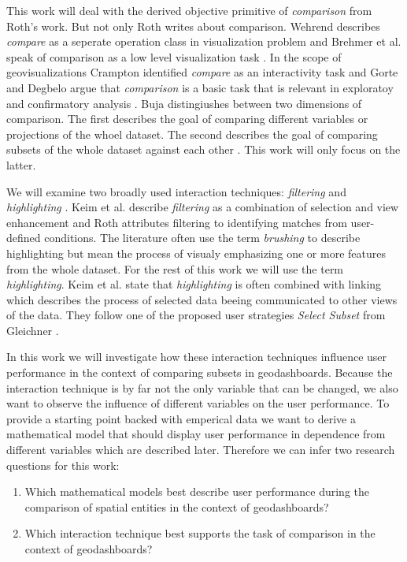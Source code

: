 This work will deal with the derived objective primitive of \textit{comparison} from Roth's work.
But not only Roth writes about comparison. Wehrend describes \textit{compare} as a seperate
operation class in visualization problem \citep{Wehrend.1990} and Brehmer et al.
speak of comparison as a low level visualization task \citep*{Brehmer.2013}. In the
scope of geovisualizations Crampton identified \textit{compare} as an interactivity task
\citep{Crampton.2002} and Gorte and Degbelo argue that \textit{comparison} is a basic
task that is relevant in exploratoy and confirmatory analysis \citep{Gorte.2022}.
Buja distingiushes between two dimensions of comparison. The first
describes the goal of comparing different variables or projections of the whoel dataset.
The second describes the goal of comparing subsets of the whole dataset against each
other \citep*{Buja.1996}. This work will only focus on the latter. 

We will examine two broadly used interaction techniques: \textit{filtering} and
\textit{highlighting} \citep*{Keim.2005,Roth.2013}. Keim et al. describe \textit{filtering} as a
combination of selection and view enhancement and Roth attributes filtering to identifying matches
from user-defined conditions. The literature often use the term \textit{brushing} 
to describe highlighting but mean the process of visualy emphasizing one or more features from the
whole dataset. For the rest of this work we will use the term \textit{highlighting}. Keim et al. state
that \textit{highlighting} is often combined with linking which describes the process of selected data
beeing communicated to other views of the data. They follow one of the proposed user strategies
\textit{Select Subset} from Gleichner \citep*{Gleicher.2018}.

In this work we will investigate how these interaction techniques influence user performance
in the context of comparing subsets in geodashboards. Because the interaction technique is
by far not the only variable that can be changed, we also want to observe the influence of
different variables on the user performance. To provide a starting point backed with emperical
data we want to derive a mathematical model that should display user performance in dependence
from different variables which are described later. Therefore we can infer two research
questions for this work:
\begin{enumerate}
    \item Which mathematical models best describe user performance during the comparison of spatial entities
    in the context of geodashboards?
    \item Which interaction technique best supports the task of comparison in the context of
    geodashboards? 
\end{enumerate}

